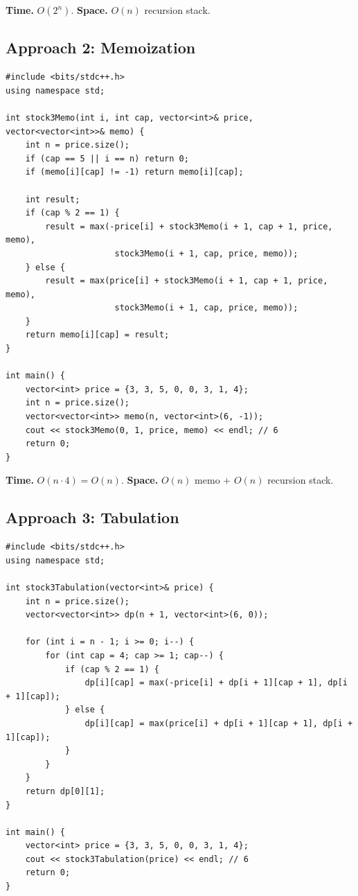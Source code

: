 \begin{complexitybox}
\textbf{Time.} $O(2^n)$.
\textbf{Space.} $O(n)$ recursion stack.
\end{complexitybox}

\subsection*{Approach 2: Memoization}

\begin{lstlisting}
#include <bits/stdc++.h>
using namespace std;

int stock3Memo(int i, int cap, vector<int>& price, vector<vector<int>>& memo) {
    int n = price.size();
    if (cap == 5 || i == n) return 0;
    if (memo[i][cap] != -1) return memo[i][cap];

    int result;
    if (cap % 2 == 1) {
        result = max(-price[i] + stock3Memo(i + 1, cap + 1, price, memo),
                      stock3Memo(i + 1, cap, price, memo));
    } else {
        result = max(price[i] + stock3Memo(i + 1, cap + 1, price, memo),
                      stock3Memo(i + 1, cap, price, memo));
    }
    return memo[i][cap] = result;
}

int main() {
    vector<int> price = {3, 3, 5, 0, 0, 3, 1, 4};
    int n = price.size();
    vector<vector<int>> memo(n, vector<int>(6, -1));
    cout << stock3Memo(0, 1, price, memo) << endl; // 6
    return 0;
}
\end{lstlisting}

\begin{complexitybox}
\textbf{Time.} $O(n \cdot 4) = O(n)$.
\textbf{Space.} $O(n)$ memo $+$ $O(n)$ recursion stack.
\end{complexitybox}

\subsection*{Approach 3: Tabulation}

\begin{lstlisting}
#include <bits/stdc++.h>
using namespace std;

int stock3Tabulation(vector<int>& price) {
    int n = price.size();
    vector<vector<int>> dp(n + 1, vector<int>(6, 0));

    for (int i = n - 1; i >= 0; i--) {
        for (int cap = 4; cap >= 1; cap--) {
            if (cap % 2 == 1) {
                dp[i][cap] = max(-price[i] + dp[i + 1][cap + 1], dp[i + 1][cap]);
            } else {
                dp[i][cap] = max(price[i] + dp[i + 1][cap + 1], dp[i + 1][cap]);
            }
        }
    }
    return dp[0][1];
}

int main() {
    vector<int> price = {3, 3, 5, 0, 0, 3, 1, 4};
    cout << stock3Tabulation(price) << endl; // 6
    return 0;
}
\end{lstlisting}

